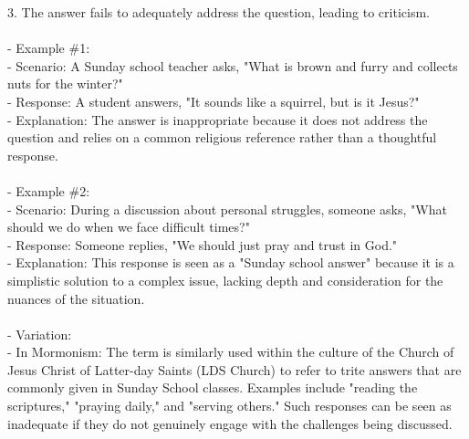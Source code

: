 \documentclass[a4paper,12pt,single,pdftex]{scrbook}
\begin{document}
    
        3. The answer fails to adequately address the question, leading to criticism.
    \\

    
      
    \\

    
      - Example \#1:
    \\

    
        - Scenario: A Sunday school teacher asks, "What is brown and furry and collects nuts for the winter?"
    \\

    
        - Response: A student answers, "It sounds like a squirrel, but is it Jesus?"
    \\

    
        - Explanation: The answer is inappropriate because it does not address the question and relies on a common religious reference rather than a thoughtful response.
    \\

    
      
    \\

    
      - Example \#2:
    \\

    
        - Scenario: During a discussion about personal struggles, someone asks, "What should we do when we face difficult times?"
    \\

    
        - Response: Someone replies, "We should just pray and trust in God."
    \\

    
        - Explanation: This response is seen as a "Sunday school answer" because it is a simplistic solution to a complex issue, lacking depth and consideration for the nuances of the situation.
    \\

    
      
    \\

    
      - Variation:
    \\

    
        - In Mormonism: The term is similarly used within the culture of the Church of Jesus Christ of Latter-day Saints (LDS Church) to refer to trite answers that are commonly given in Sunday School classes. Examples include "reading the scriptures," "praying daily," and "serving others." Such responses can be seen as inadequate if they do not genuinely engage with the challenges being discussed.
    \\
\end{document}
